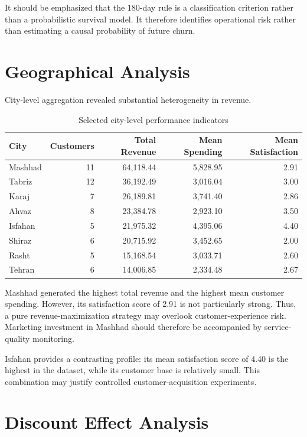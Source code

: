 \documentclass[11pt,a4paper]{article}
\begin{document}
It should be emphasized that the 180-day rule is a classification
criterion rather than a probabilistic survival model. It therefore
identifies operational risk rather than estimating a causal probability
of future churn.

\section{Geographical Analysis}

City-level aggregation revealed substantial heterogeneity in revenue.

\begin{table}[H]
\centering
\caption{Selected city-level performance indicators}
\label{tab:city}
\begin{tabular}{lrrrr}
\toprule
City & Customers & Total Revenue & Mean Spending & Mean Satisfaction \\
\midrule
Mashhad & 11 & 64,118.44 & 5,828.95 & 2.91 \\
Tabriz & 12 & 36,192.49 & 3,016.04 & 3.00 \\
Karaj & 7 & 26,189.81 & 3,741.40 & 2.86 \\
Ahvaz & 8 & 23,384.78 & 2,923.10 & 3.50 \\
Isfahan & 5 & 21,975.32 & 4,395.06 & 4.40 \\
Shiraz & 6 & 20,715.92 & 3,452.65 & 2.00 \\
Rasht & 5 & 15,168.54 & 3,033.71 & 2.60 \\
Tehran & 6 & 14,006.85 & 2,334.48 & 2.67 \\
\bottomrule
\end{tabular}
\end{table}

Mashhad generated the highest total revenue and the highest mean
customer spending. However, its satisfaction score of 2.91 is not
particularly strong. Thus, a pure revenue-maximization strategy may
overlook customer-experience risk. Marketing investment in Mashhad
should therefore be accompanied by service-quality monitoring.

Isfahan provides a contrasting profile: its mean satisfaction score of
4.40 is the highest in the dataset, while its customer base is relatively
small. This combination may justify controlled customer-acquisition
experiments.

\section{Discount Effect Analysis}
\end{document}
